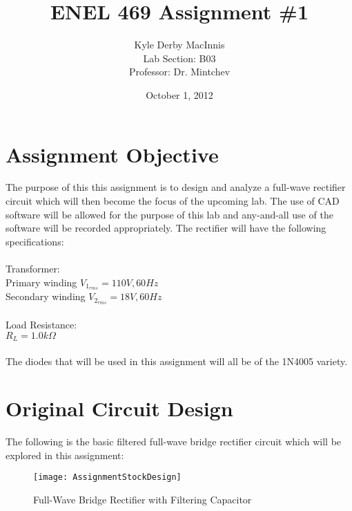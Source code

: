 \documentclass[]{article}
\title{\textbf{ENEL 469 Assignment \#1}}
\author{Kyle Derby MacInnis \\ Lab Section: B03 \\ Professor: Dr. Mintchev}
\date{October 1, 2012}
\begin{document}
\maketitle

\pagebreak

\section*{Assignment Objective}
{
	The purpose of this this assignment is to design and analyze a full-wave rectifier circuit which will then become the focus of the upcoming lab. The use of CAD software will be allowed for the purpose of this lab and any-and-all use of the software will be recorded appropriately. The rectifier will have the following specifications:
	\\ \\
	Transformer:
	\\	\indent Primary winding $V_{1_{rms}} = 110V, 60Hz$
	\\	\indent Secondary winding $V_{2_{rms}} = 18V, 60Hz$
	\\ \\
	Load Resistance:
	\\	\indent $R_L = 1.0k\Omega$
	\\ \\
	The diodes that will be used in this assignment will all be of the 1N4005 variety.
}

\section*{Original Circuit Design}
{
	The following is the basic filtered full-wave bridge rectifier circuit which will be explored in this assignment:
	\begin{figure}[here]
		\texttt{[image: AssignmentStockDesign]}
		\caption{Full-Wave Bridge Rectifier with Filtering Capacitor}
	\end{figure}
}

\pagebreak

\end{document}
